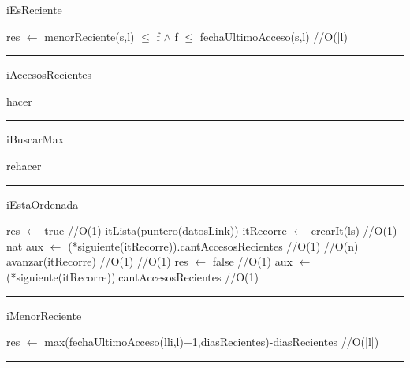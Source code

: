 \begin{algorithm}[H]
\caption{iEsReciente}
\begin{algorithmic}[1]
\state res $\gets$ menorReciente(s,l) $\leq$ f $\land$ f $\leq$ fechaUltimoAcceso(s,l) \hfill//O(|l)
\EndFunction 
\end{algorithmic}
\hrule
{}
\end{algorithm}

\begin{algorithm}[H]
\caption{iAccesosRecientes}
\begin{algorithmic}[1]
\state hacer
\EndFunction 
\end{algorithmic}
\hrule
{}
\end{algorithm}

\begin{algorithm}[H]
\caption{iBuscarMax}
\begin{algorithmic}[1]
\state rehacer
\EndFunction 
\end{algorithmic}
\hrule
{}
\end{algorithm}

\begin{algorithm}[H]
\caption{iEstaOrdenada}
\begin{algorithmic}[1]
\state res $\gets$ true \hfill //O(1)
\state itLista(puntero(datosLink)) itRecorre $\gets$ crearIt(ls) \hfill //O(1)
\state nat aux $\gets$ (*siguiente(itRecorre)).cantAccesosRecientes \hfill //O(1)
 \hfill //O(n)
\state avanzar(itRecorre) \hfill //O(1)
 \hfill //O(1)
\state res $\gets$ false \hfill //O(1)
\endif
\state aux $\gets$ (*siguiente(itRecorre)).cantAccesosRecientes \hfill //O(1)
\endwhile
\EndFunction 
\end{algorithmic}
\hrule
{}
\end{algorithm}

\begin{algorithm}[H]
\caption{iMenorReciente}
\begin{algorithmic}[1]
\state res $\gets$ max(fechaUltimoAcceso(lli,l)+1,diasRecientes)-diasRecientes \hfill //O(|l|)
\EndFunction 
\end{algorithmic}
\hrule
{}
\end{algorithm}

